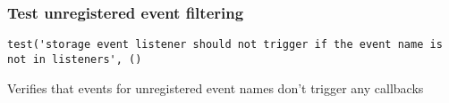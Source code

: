 \documentclass[a4paper]{article}
\begin{document}
\hypertarget{toc737}{}
\subsubsection{Test unregistered event filtering}

\begin{lstlisting}
test('storage event listener should not trigger if the event name is not in listeners', ()
\end{lstlisting}

Verifies that events for unregistered event names don't trigger
any callbacks

\end{document}
